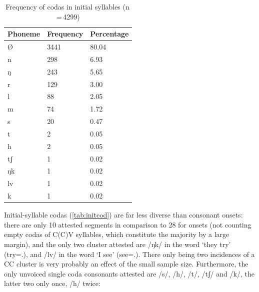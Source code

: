 \begin{table}[pt]\centering
\caption[Frequency of codas in initial syllables]{Frequency of codas in initial 
syllables (n\,=\,4299)}
\begin{tabu} to 0.67\linewidth{X X[c] X[c]}
\tableheaderfont\toprule
Phoneme
	& Frequency
	& Percentage
	\\
	
\toprule

Ø
	& 3441
	& 80.04\pct
	\\

\midrule

n
	& 298
	& 6.93\pct
	\\

ŋ
	& 243
	& 5.65\pct
	\\

r
	& 129
	& 3.00\pct
	\\

l
	& 88
	& 2.05\pct
	\\

m
	& 74
	& 1.72\pct
	\\

s
	& 20
	& 0.47\pct
	\\

t
	& 2
	& 0.05\pct
	\\

h
	& 2
	& 0.05\pct
	\\
	
tʃ
	& 1
	& 0.02\pct
	\\

ŋk
	& 1
	& 0.02\pct
	\\

lv
	& 1
	& 0.02\pct
	\\

k
	& 1
	& 0.02\pct
	\\

\bottomrule
\end{tabu}
\label{tab:initcod}
\end{table}

Initial-syllable codas (\autoref{tab:initcod}) are far less diverse than 
consonant onsets: there are only 10 attested segments in comparison to 28 for 
onsets (not counting empty codas of C(C)V syllables, which constitute the 
majority by a large margin), and the only two cluster attested are /ŋk/ in the 
word  `they try' (try=\TplM{}.\Aarg{}), and /lv/ in the 
word  `I see' (see=\Fpl{}.\Aarg{}). There only being 
two incidences of a CC cluster is very probably an effect of the small 
sample size. Furthermore, the only unvoiced single coda consonants attested are 
/s/, /h/, /t/, /tʃ/ and /k/, the latter two only once, /h/ twice:

